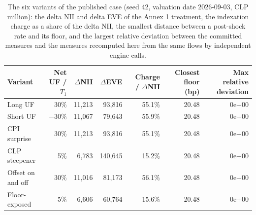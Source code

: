 \begin{table}[htbp]
\centering
\footnotesize
\setlength{\tabcolsep}{3.5pt}
\caption{The six variants of the published case (seed 42, valuation date 2026-09-03, CLP million): the delta NII and delta EVE of the Annex 1 treatment, the indexation charge as a share of the delta NII, the smallest distance between a post-shock rate and its floor, and the largest relative deviation between the committed measures and the measures recomputed here from the same flows by independent engine calls.}
\label{tab:reproduction}
\begin{tabular}{lrrrrrr}
\toprule
Variant & Net UF / $T_1$ & $\Delta$NII & $\Delta$EVE & Charge / $\Delta$NII & Closest floor (bp) & Max relative deviation \\
\midrule
Long UF & 30\% & 11{,}213 & 93{,}816 & 55.1\% & 20.48 & 0e+00 \\
Short UF & $-$30\% & 11{,}067 & 79{,}643 & 55.9\% & 20.48 & 0e+00 \\
CPI surprise & 30\% & 11{,}213 & 93{,}816 & 55.1\% & 20.48 & 0e+00 \\
CLP steepener & 5\% & 6{,}783 & 140{,}645 & 15.2\% & 20.48 & 0e+00 \\
Offset on and off & 30\% & 11{,}016 & 81{,}173 & 56.1\% & 20.48 & 0e+00 \\
Floor-exposed & 5\% & 6{,}606 & 60{,}764 & 15.6\% & 20.48 & 0e+00 \\
\bottomrule
\end{tabular}
\end{table}
